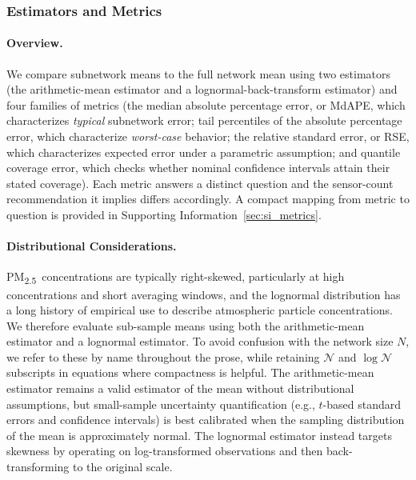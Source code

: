 \documentclass[12pt]{article}
\theoremstyle{remark}
\newcommand{\pmtt}{\textrm{PM\textsubscript{2.5}}}
\begin{document}
\subsubsection{Estimators and Metrics} \label{sec:estimators_metrics}
\paragraph{Overview.} We compare subnetwork means to the full network mean using two estimators (the arithmetic-mean estimator and a lognormal-back-transform estimator) and four families of metrics (the median absolute percentage error, or MdAPE, which characterizes \emph{typical} subnetwork error; tail percentiles of the absolute percentage error, which characterize \emph{worst-case} behavior; the relative standard error, or RSE, which characterizes expected error under a parametric assumption; and quantile coverage error, which checks whether nominal confidence intervals attain their stated coverage). Each metric answers a distinct question and the sensor-count recommendation it implies differs accordingly. A compact mapping from metric to question is provided in Supporting Information~\ref{sec:si_metrics}.

\paragraph{Distributional Considerations.}
\pmtt\ concentrations are typically right-skewed, particularly at high concentrations and short averaging windows, and the lognormal distribution has a long history of empirical use to describe atmospheric particle concentrations.\supercite{kahn_1973_NoteDistributionAir,ott_1990_PhysicalExplanationLognormality,andersson_2021_MechanismsLogNormala,bencala_1976_FrequencyDistributionsAir} We therefore evaluate sub-sample means using both the arithmetic-mean estimator and a lognormal estimator. To avoid confusion with the network size $N$, we refer to these by name throughout the prose, while retaining $\mathcal{N}$ and $\log\mathcal{N}$ subscripts in equations where compactness is helpful. The arithmetic-mean estimator remains a valid estimator of the mean without distributional assumptions, but small-sample uncertainty quantification (e.g., $t$-based standard errors and confidence intervals) is best calibrated when the sampling distribution of the mean is approximately normal. The lognormal estimator instead targets skewness by operating on log-transformed observations and then back-transforming to the original scale.
\end{document}
